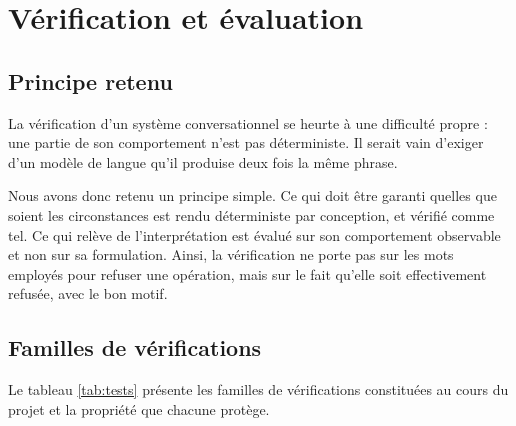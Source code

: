 \section{Vérification et évaluation}

\subsection{Principe retenu}

La vérification d'un système conversationnel se heurte à une difficulté propre : une partie de son comportement n'est pas déterministe. Il serait vain d'exiger d'un modèle de langue qu'il produise deux fois la même phrase.

Nous avons donc retenu un principe simple. Ce qui doit être garanti quelles que soient les circonstances est rendu déterministe par conception, et vérifié comme tel. Ce qui relève de l'interprétation est évalué sur son comportement observable et non sur sa formulation. Ainsi, la vérification ne porte pas sur les mots employés pour refuser une opération, mais sur le fait qu'elle soit effectivement refusée, avec le bon motif.

\subsection{Familles de vérifications}

Le tableau \ref{tab:tests} présente les familles de vérifications constituées au cours du projet et la propriété que chacune protège.


